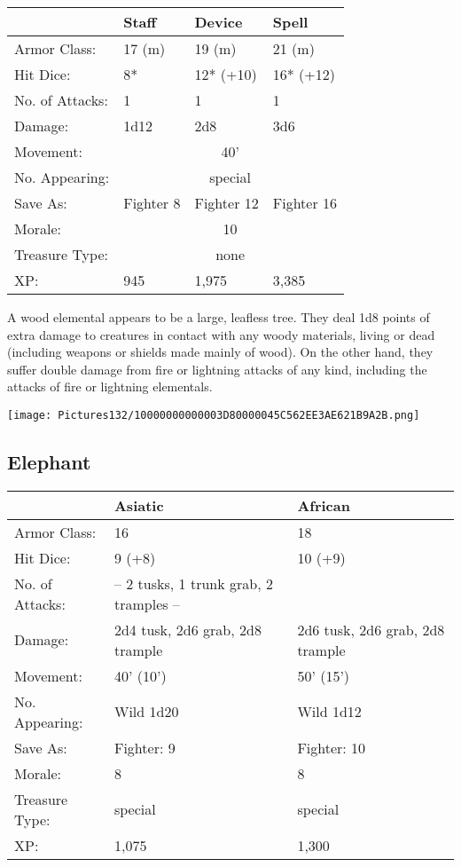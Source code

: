 \documentclass[a4paper,twoside,openany,10pt]{book}
\begin{document}
\begin{multicols}{2}
\begin{tabularx}{0.48\textwidth}{@{}lllX@{}}
& Staff & Device & Spell \\\hline
Armor Class: & 17 (m) & 19 (m) & 21 (m) \\\hline
Hit Dice: & 8* & 12* (+10) & 16* (+12) \\\hline
No. of Attacks: & 1 & 1 & 1 \\\hline
Damage: & 1d12 & 2d8 & 3d6 \\\hline
Movement:  & \multicolumn{3}{c}{40'}\\\hline
No. Appearing: &\multicolumn{3}{c}{special} \\\hline
Save As: & Fighter 8 & Fighter 12 & Fighter 16 \\\hline
Morale: & \multicolumn{3}{c}{10} \\\hline
Treasure Type: & \multicolumn{3}{c}{none} \\\hline
XP: & 945 & 1,975 & 3,385 \\\hline
\end{tabularx}\medskip

A wood elemental appears to be a large, leafless tree. They deal 1d8 points of extra damage to creatures in contact with any woody materials, living or dead (including weapons or shields made mainly of wood). On the other hand, they suffer double damage from fire or lightning attacks of any kind, including the attacks of fire or lightning elementals.\\

\begin{center}
	\texttt{[image: Pictures132/10000000000003D80000045C562EE3AE621B9A2B.png]}

\end{center}


\subsection*{Elephant}\label{elephant}

\begin{tabularx}{0.48\textwidth}{@{}lXX@{}}
& Asiatic & African \\\hline
Armor Class: & 16 & 18 \\\hline
Hit Dice: & 9 (+8) & 10 (+9) \\\hline
No. of Attacks: & -- 2 tusks, 1 trunk grab, 2 tramples -- & \\\hline
Damage: & 2d4 tusk, 2d6 grab, 2d8 trample & 2d6 tusk, 2d6 grab, 2d8 trample \\\hline
Movement: & 40' (10') & 50' (15') \\\hline
No. Appearing: & Wild 1d20 & Wild 1d12 \\\hline
Save As: & Fighter: 9 & Fighter: 10 \\\hline
Morale: & 8 & 8 \\\hline
Treasure Type: & special & special \\\hline
XP: & 1,075 & 1,300 \\\hline
\end{tabularx}\medskip


\end{multicols}
\end{document}
